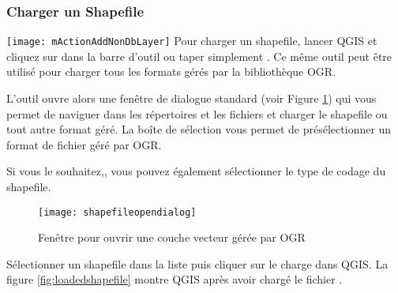 \subsubsection{Charger un Shapefile}\label{sec:load_shapefile}
\texttt{[image: mActionAddNonDbLayer]}
Pour charger un shapefile, lancer QGIS et cliquez sur  dans la barre d'outil ou taper simplement . Ce même outil peut être utilisé pour charger tous les formats gérés par la bibliothèque OGR.

L'outil ouvre alors une fenêtre de dialogue standard (voir Figure \ref{fig:openshapefile}) qui vous permet de naviguer dans les répertoires et les fichiers et charger le shapefile ou tout autre format géré.
La boîte de sélection  vous permet de présélectionner un format de fichier géré par OGR.

Si vous le souhaitez,, vous pouvez également sélectionner le type de codage du shapefile.

\begin{figure}[ht]
  \begin{center}
  \caption{Fenêtre pour ouvrir une couche vecteur gérée par OGR \nixcaption}\label{fig:openshapefile}\smallskip
  \texttt{[image: shapefileopendialog]}
\end{center}
\end{figure}

Sélectionner un shapefile dans la liste puis cliquer sur  le charge dans QGIS. La figure \ref{fig:loadedshapefile} montre QGIS après avoir chargé le fichier .


